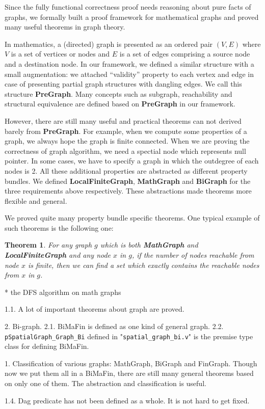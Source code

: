 Since the fully functional correctness proof needs reasoning about
pure facts of graphs, we formally built a proof framework for
mathematical graphs and proved many useful theorems in graph
theory.

In mathematics, a (directed) graph is presented as an ordered pair
$(V, E)$ where $V$ is a set of vertices or nodes and $E$ is a set of
edges comprising a source node and a destination node. In our
framework, we defined a similar structure with a small augmentation:
we attached ``validity'' property to each vertex and edge in case of
presenting partial graph structures with dangling edges. We call this
structure \textbf{PreGraph}. Many concepts such as subgraph,
reachability and structural equivalence are defined based
on \textbf{PreGraph} in our framework.

However, there are still many useful and practical theorems can not
derived barely from \textbf{PreGraph}. For example, when we compute
some properties of a graph, we always hope the graph is finite
connected. When we are proving the correctness of graph algorithm, we
need a spectial node which represents null pointer. In some cases, we
have to specify a graph in which the outdegree of each nodes is 2. All
these additional properties are abstracted as different property
bundles. We defined \textbf{LocalFiniteGraph}, \textbf{MathGraph}
and \textbf{BiGraph} for the three requirements above
respectively. These abstractions made theorems more flexible and
general.

We proved quite many property bundle specific theorems. One typical
example of such theorems is the following one:
\newtheorem{mythm}{Theorem}
\begin{mythm}
For any graph $g$ which is both \textbf{MathGraph}
and \textbf{LocalFiniteGraph} and any node $x$ in $g$, if the number
of nodes reachable from node $x$ is finite, then we can find a set
which exactly contains the reachable nodes from $x$ in $g$.
\end{mythm}


* the DFS algorithm on math graphs

1.1. A lot of important theorems about graph are proved.

2. Bi-graph.
2.1. BiMaFin is defined as one kind of general graph.
2.2. \texttt{pSpatialGraph\_Graph\_Bi} defined in "\texttt{spatial\_graph\_bi.v}" is the premise type class for defining BiMaFin.

1. Classification of various graphs: MathGraph, BiGraph and FinGraph. Though now we put them all in a BiMaFin, there are still many general theorems based on only one of them. The abstraction and classification is useful.

1.4. Dag predicate has not been defined as a whole. It is not hard to get fixed.
